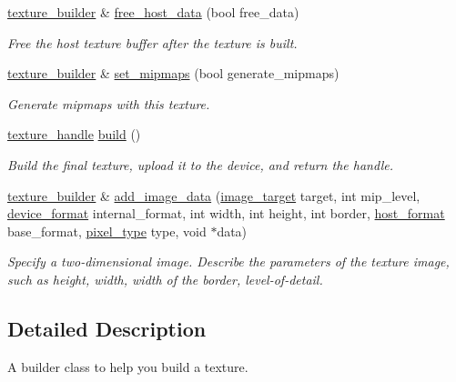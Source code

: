 \begin{DoxyCompactItemize}
\mbox{\hyperlink{classmoka_1_1texture__builder}{texture\+\_\+builder}} \& \mbox{\hyperlink{classmoka_1_1texture__builder_a64f4ead902072e54312ea7d4a7d290bd}{free\+\_\+host\+\_\+data}} (bool free\+\_\+data)
\begin{DoxyCompactList}\small\item\em Free the host texture buffer after the texture is built. \end{DoxyCompactList}\item 
\mbox{\hyperlink{classmoka_1_1texture__builder}{texture\+\_\+builder}} \& \mbox{\hyperlink{classmoka_1_1texture__builder_a5dd6e175a28e9dd958c08103e48e30d6}{set\+\_\+mipmaps}} (bool generate\+\_\+mipmaps)
\begin{DoxyCompactList}\small\item\em Generate mipmaps with this texture. \end{DoxyCompactList}\item 
\mbox{\hyperlink{structmoka_1_1texture__handle}{texture\+\_\+handle}} \mbox{\hyperlink{classmoka_1_1texture__builder_a7bdc422d994555b2b9d6766a0e8b9a0d}{build}} ()
\begin{DoxyCompactList}\small\item\em Build the final texture, upload it to the device, and return the handle. \end{DoxyCompactList}\item 
\mbox{\hyperlink{classmoka_1_1texture__builder}{texture\+\_\+builder}} \& \mbox{\hyperlink{classmoka_1_1texture__builder_ae90b0d4367a36e031d136970805cd311}{add\+\_\+image\+\_\+data}} (\mbox{\hyperlink{namespacemoka_a6f402ae62a72ce17ff73fa94d526800e}{image\+\_\+target}} target, int mip\+\_\+level, \mbox{\hyperlink{namespacemoka_ac2d188857be60286ff735744a33ebd2d}{device\+\_\+format}} internal\+\_\+format, int width, int height, int border, \mbox{\hyperlink{namespacemoka_a1989c05aecf3bb10bbf8a7027e3df130}{host\+\_\+format}} base\+\_\+format, \mbox{\hyperlink{namespacemoka_a067d388d48715c4e725cd426d5bf3770}{pixel\+\_\+type}} type, void $\ast$data)
\begin{DoxyCompactList}\small\item\em Specify a two-\/dimensional image. Describe the parameters of the texture image, such as height, width, width of the border, level-\/of-\/detail. \end{DoxyCompactList}\end{DoxyCompactItemize}


\subsection{Detailed Description}
A builder class to help you build a texture. 

